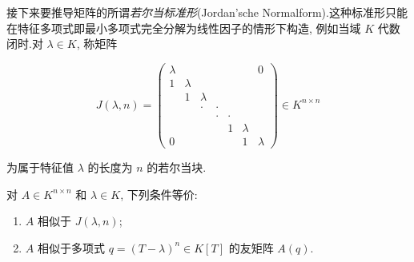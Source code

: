 接下来要推导矩阵的所谓\emph{若尔当标准形}(\textup{Jordan'sche Normalform}).这种标准形只能在特征多项式即最小多项式完全分解为线性因子的情形下构造, 例如当域 $K$ 代数闭时.对 $\lambda \in K$, 称矩阵

\[
J(\lambda, n) = \left(\begin{array}{ccccccc}
\lambda & & & & & & 0 \\
1 & \lambda & & & & & \\
 & 1 & \lambda & & & & \\
 & & \cdot & \cdot & & & \\
 & & & \cdot & \cdot & & \\
 & & & & 1 & \lambda & \\
0 & & & & & 1 & \lambda
\end{array}\right) \in K^{n \times n}\]

为属于特征值 $\lambda$ 的长度为 $n$ 的若尔当块.

\begin{lemma}\label{lem:6.5.14}
对 $A \in K^{n \times n}$ 和 $\lambda \in K$, 下列条件等价:
\begin{enumerate}
\item[(i)] $A$ 相似于 $J(\lambda, n)$;
\item[(ii)] $A$ 相似于多项式 $q = (T - \lambda)^n \in K[T]$ 的友矩阵 $A(q)$.
\end{enumerate}
\end{lemma}

